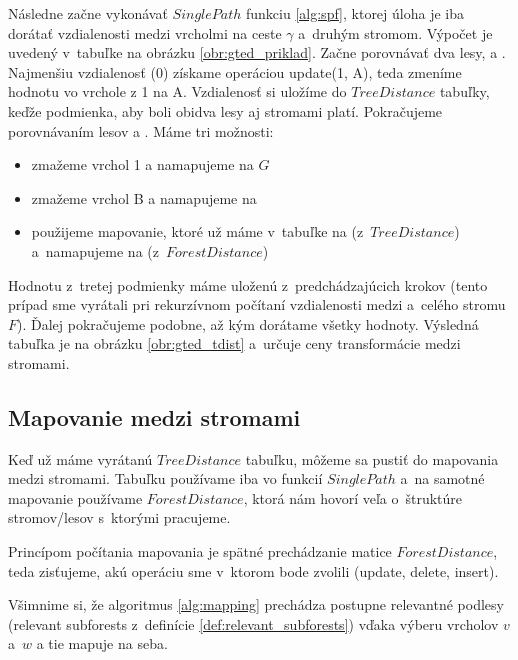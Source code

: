 

Následne začne vykonávať $SinglePath$ funkciu \ref{alg:spf}, ktorej úloha je iba dorátať
vzdialenosti medzi vrcholmi na ceste $\gamma$ a~druhým stromom.
Výpočet je uvedený v~tabuľke na obrázku \ref{obr:gted_priklad}.
Začne porovnávať dva lesy,  a . Najmenšiu vzdialenosť (0) získame operáciou
update(1, A), teda zmeníme hodnotu vo vrchole z 1 na A. Vzdialenosť si uložíme do $TreeDistance$
tabuľky, keďže podmienka, aby boli obidva lesy aj stromami platí.
Pokračujeme porovnávaním lesov  a .
Máme tri možnosti:
\begin{itemize}
  \item zmažeme vrchol 1 a namapujeme \set{} na $G$
  \item zmažeme vrchol B a namapujeme  na 
  \item použijeme mapovanie, ktoré už máme v~tabuľke  na  (z~$TreeDistance$)
    a~namapujeme \set{} na  (z~$ForestDistance$)
\end{itemize}
Hodnotu z~tretej podmienky máme uloženú z~predchádzajúcich krokov (tento prípad sme vyrátali
pri rekurzívnom počítaní vzdialenosti medzi  a~celého stromu $F$).
Ďalej pokračujeme podobne, až kým dorátame všetky hodnoty.
Výsledná tabuľka je na obrázku \ref{obr:gted_tdist} a~určuje ceny transformácie
medzi stromami.






\subsection{Mapovanie medzi stromami}

Keď už máme vyrátanú $TreeDistance$ tabuľku, môžeme sa pustiť do mapovania medzi
stromami. Tabuľku používame iba vo funkcií $SinglePath$ a~na samotné mapovanie
používame $ForestDistance$, ktorá nám hovorí veľa o~štruktúre stromov/lesov
s~ktorými pracujeme.



Princípom počítania mapovania je spätné prechádzanie matice $ForestDistance$, teda
zisťujeme, akú operáciu sme v~ktorom bode zvolili (update, delete, insert).

Všimnime si, že algoritmus \ref{alg:mapping} prechádza postupne
relevantné podlesy (relevant subforests z~definície \ref{def:relevant_subforests})
vďaka výberu vrcholov $v$ a~$w$ a tie mapuje na seba.

